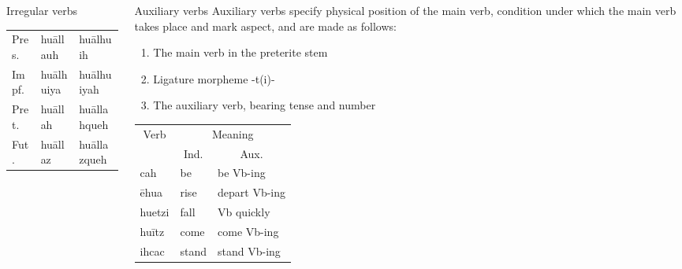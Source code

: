 \documentclass[12pt]{beamer}
\newcommand{\nah}[1]{\textcolor{nahgrn}{#1}}
\newcommand{\trs}[1]{\textcolor{nahblu}{#1}}
\begin{document}
\begin{frame}
\begin{columns}[t]
\begin{column}{.18\linewidth}
\begin{block}{Irregular verbs}
\begin{enumerate}
\begin{tabular}[t]{lll}
                            Pres. & \nah{huāllauh} & \nah{huālhuih} \\
                            Impf. & \nah{huālhuiya} & \nah{huālhuiyah} \\
                            Pret. & \nah{huāllah} & \nah{huāllahqueh} \\
                            Fut. & \nah{huāllaz} & \nah{huāllazqueh} \\
                          \end{tabular}%
                        \end{enumerate}
                      \end{block}
                    \end{column}
                    \begin{column}{.18\linewidth}
                      \begin{block}{Auxiliary verbs}
                        Auxiliary verbs specify physical position of the main verb, condition under which the main verb takes place and mark aspect, and are made as follows:
                        \begin{enumerate}
                        \item The main verb in the preterite stem
                        \item Ligature morpheme \nah{-t(i)-}
                        \item The auxiliary verb, bearing tense and number
                        \end{enumerate}
                        \begin{threeparttable}
                          \begin{tabular}{lll}
                            \multicolumn{1}{c}{Verb}& \multicolumn{2}{c}{Meaning}\\
                                                    & \multicolumn{1}{c}{Ind.} & \multicolumn{1}{c}{Aux.} \\ 
                            \nah{cah}    & \trs{be}                  & \trs{be Vb-ing}         \\
                            \nah{ēhua}   & \trs{rise}        & \trs{depart   Vb-ing}   \\
                            \nah{huetzi} & \trs{fall}                & \trs{Vb   quickly}      \\
                            \nah{huītz}  & \trs{come}                & \trs{come   Vb-ing}     \\
                            \nah{ihcac}  & \trs{stand}               & \trs{stand   Vb-ing}    \\

\end{tabular}
\end{threeparttable}
\end{block}
\end{column}
\end{columns}
\end{frame}
\end{document}
